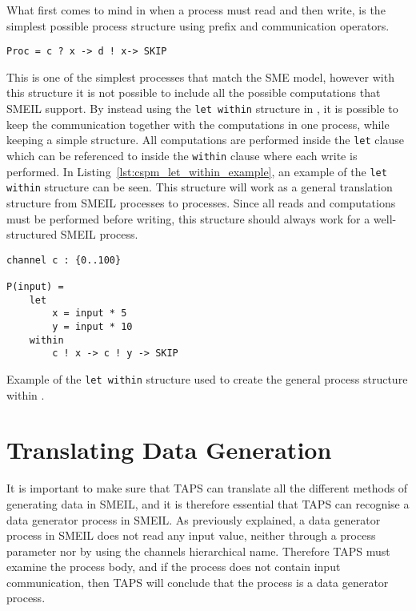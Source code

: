 What first comes to mind in \cspm{} when a process must read and then write, is the simplest possible process structure using prefix and communication operators.
\begin{verbatim}
Proc = c ? x -> d ! x-> SKIP
\end{verbatim}
This is one of the simplest \cspm{} processes that match the SME model, however with this structure it is not possible to include all the possible computations that SMEIL support. By instead using the \texttt{let within} structure in \cspm{}, it is possible to keep the communication together with the computations in one \cspm{} process, while keeping a simple structure. All computations are performed inside the \texttt{let} clause which can be referenced to inside the \texttt{within} clause where each write is performed.
In Listing~\ref{lst:cspm_let_within_example}, an example of the \texttt{let within} structure can be seen. This structure will work as a general translation structure from SMEIL processes to \cspm{} processes. Since all reads and computations must be performed before writing, this structure should always work for a well-structured SMEIL process.
\begin{listing}
\begin{verbatim}
channel c : {0..100}

P(input) =
    let
        x = input * 5
        y = input * 10
    within
        c ! x -> c ! y -> SKIP
\end{verbatim}
\caption{Example of the \texttt{let within} structure used to create the general process structure within \cspm{}.}
\label{lst:cspm_let_within_example}
\end{listing}
\section{Translating Data Generation}
It is important to make sure that TAPS can translate all the different methods of generating data in SMEIL, and it is therefore essential that TAPS can recognise a data generator process in SMEIL. As previously explained, a data generator process in SMEIL does not read any input value, neither through a process parameter nor by using the channels hierarchical name. Therefore TAPS must examine the process body, and if the process does not contain input communication, then TAPS will conclude that the process is a data generator process. \\

